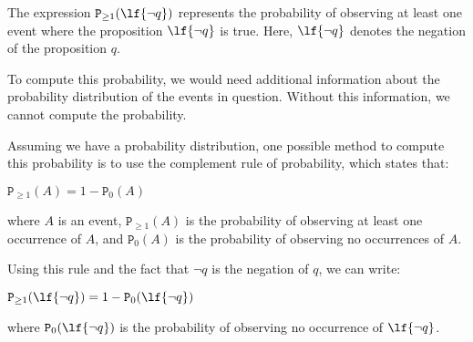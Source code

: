 \documentclass[11pt]{article}
\begin{document}
The expression $\mathtt{P}_{\geq 1}(\lf{\neg q})$ represents the probability of observing at least one event where the proposition $\lf{\neg q}$ is true. Here, $\lf{\neg q}$ denotes the negation of the proposition $q$.

To compute this probability, we would need additional information about the probability distribution of the events in question. Without this information, we cannot compute the probability.

Assuming we have a probability distribution, one possible method to compute this probability is to use the complement rule of probability, which states that:

$\mathtt{P}_{\geq 1}(A) = 1 - \mathtt{P}_0(A)$

where $A$ is an event, $\mathtt{P}_{\geq 1}(A)$ is the probability of observing at least one occurrence of $A$, and $\mathtt{P}_0(A)$ is the probability of observing no occurrences of $A$.

Using this rule and the fact that $\neg q$ is the negation of $q$, we can write:

$\mathtt{P}_{\geq 1}(\lf{\neg q}) = 1 - \mathtt{P}_0(\lf{\neg q})$

where $\mathtt{P}_0(\lf{\neg q})$ is the probability of observing no occurrence of $\lf{\neg q}$.
\end{document}
